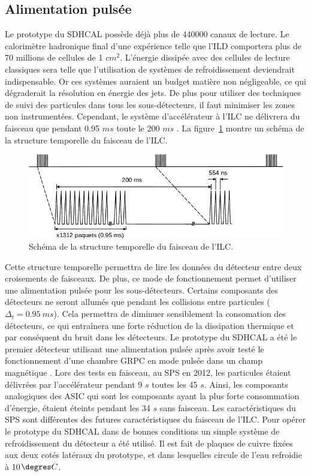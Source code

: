 \subsection{Alimentation pulsée}
Le prototype du SDHCAL possède déjà plus de 440000 canaux de lecture. Le calorimètre hadronique final d'une expérience telle que l'ILD comportera plus de 70 millions de cellules de 1 $cm^2$. L'énergie dissipée avec des cellules de lecture classiques sera telle que l'utilisation de systèmes de refroidissement deviendrait indispensable. Or ces systèmes auraient un budget matière non négligeable, ce qui dégraderait la résolution en énergie des jets. De plus pour utiliser des techniques de suivi des particules dans tous les sous-détecteurs, il faut minimiser les zones non instrumentées. Cependant, le système d'accélérateur à l'ILC ne délivrera du faisceau que pendant 0.95 $ms$ toute le 200 $ms$ \cite{acceleratorTDR}. La figure~\ref{fig:ILCCycle} montre un schéma de la structure temporelle du faisceau de l'ILC.
\begin{figure}[!ht]
  \begin{center}
    \includegraphics[width=.8\textwidth]{SDHCAL/figs/PPCycle.png}
    \caption{Schéma de la structure temporelle du faisceau de l'ILC.}
    \label{fig:ILCCycle}
  \end{center}
\end{figure}
Cette structure temporelle permettra de lire les données du détecteur entre deux croisements de faisceaux. De plus, ce mode de fonctionnement permet d'utiliser une alimentation pulsée pour les sous-détecteurs. Certains composants des détecteurs ne seront allumés que pendant les collisions entre particules ($\Delta_t=0.95~ms$). Cela permettra de diminuer sensiblement la consomation des détecteurs, ce qui entraînera une forte réduction de la dissipation thermique et par conséquent du bruit dans les détecteurs. Le prototype du SDHCAL a été le premier détecteur utilisant une alimentation pulsée après avoir testé le fonctionnement d'une chambre GRPC en mode pulsée dans un champ magnétique \cite{pp-in-mag-field}. Lors des tests en faisceau, au SPS en 2012, les particules étaient délivrées par l'accélérateur pendant 9 $s$ toutes les 45 $s$. Ainsi, les composants analogiques des ASIC qui sont les composants ayant la plus forte consommation d'énergie, étaient éteints pendant les 34 $s$ sans faisceau. Les caractéristiques du SPS sont différentes des futures caractéristiques du faisceau de l'ILC. Pour opérer le prototype du SDHCAL dans de bonnes conditions un simple système de refroidissement du détecteur a été utilisé. Il est fait de plaques de cuivre fixées aux deux cotés latéraux du prototype, et dans lesquelles circule de l'eau refroidie à 10$\degres C$.

